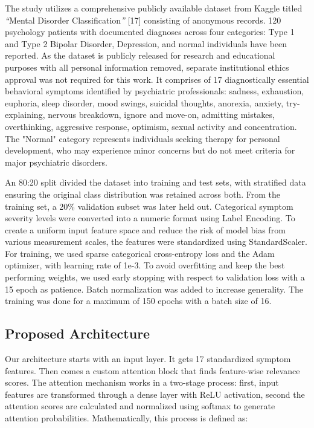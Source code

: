 \documentclass{article}
\begin{document}
The study utilizes a comprehensive publicly available dataset from Kaggle titled \emph{``}Mental Disorder Classification\emph{''} {[}17{]} consisting of anonymous records. 120 psychology patients with documented diagnoses across four categories: Type 1 and Type 2 Bipolar Disorder, Depression, and normal individuals have been reported. As the dataset is publicly released for research and educational purposes with all personal information removed, separate institutional ethics approval was not required for this work. It comprises of 17 diagnostically essential behavioral symptoms identified by psychiatric professionals: sadness, exhaustion, euphoria, sleep disorder, mood swings, suicidal thoughts, anorexia, anxiety, try-explaining, nervous breakdown, ignore and move-on, admitting mistakes, overthinking, aggressive response, optimism, sexual activity and concentration. The "Normal" category represents individuals seeking therapy for personal development, who may experience minor concerns but do not meet criteria for major psychiatric disorders.

An 80:20 split divided the dataset into training and test sets, with stratified data ensuring the original class distribution was retained across both. From the training set, a 20\% validation subset was later held out. Categorical symptom severity levels were converted into a numeric format using Label Encoding. To create a uniform input feature space and reduce the risk of model bias from various measurement scales, the features were standardized using StandardScaler. For training, we used sparse categorical cross-entropy loss and the Adam optimizer, with learning rate of 1e-3. To avoid overfitting and keep the best performing weights, we used early stopping with respect to validation loss with a 15 epoch as patience. Batch normalization was added to increase generality. The training was done for a maximum of 150 epochs with a batch size of 16.

\subsection{Proposed Architecture}

Our architecture starts with an input layer. It gets 17 standardized symptom features. Then comes a custom attention block that finds feature-wise relevance scores. The attention mechanism works in a two-stage process: first, input features are transformed through a dense layer with ReLU activation, second the attention scores are calculated and normalized using softmax to generate attention probabilities. Mathematically, this process is defined as:
\end{document}
